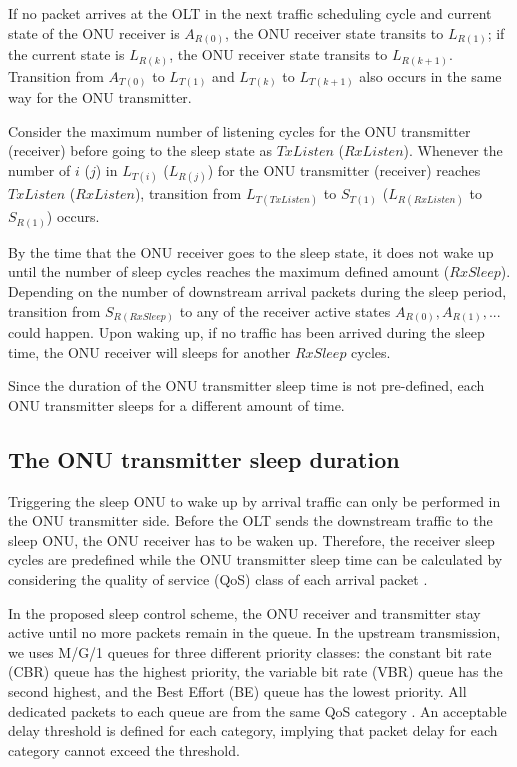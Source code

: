\documentclass[11pt,english,12pt,onecolumn, draftcls]{IEEEtran}
\theoremstyle{plain}
\theoremstyle{definition}
\begin{document}
If no packet arrives at the OLT in the next traffic scheduling cycle and current state of the ONU receiver is ${A}_{R(0)}$, the ONU receiver state transits to ${L}_{R(1)}$; if the current state is ${L}_{R(k)}$, the ONU receiver state transits to ${L}_{R(k+1)}$. Transition from ${A}_{T(0)}$ to ${L}_{T(1)}$ and ${L}_{T(k)}$ to ${L}_{T(k+1)}$ also occurs in the same way for the ONU transmitter.

Consider the maximum number of listening cycles for the ONU transmitter (receiver) before going to the sleep state as $TxListen$ ($RxListen$). Whenever the number of $i$ ($j$) in ${L}_{T(i)}$ (${L}_{R(j)}$) for the ONU transmitter (receiver) reaches $TxListen$ ($RxListen$), transition from ${L}_{T(TxListen)}$ to ${S}_{T(1)}$ (${L}_{R(RxListen)}$ to ${S}_{R(1)}$) occurs.

By the time that the ONU receiver goes to the sleep state, it does not wake up until the number of sleep cycles reaches the maximum defined amount ($RxSleep$). Depending on the number of downstream arrival packets during the sleep period, transition from ${S}_{R(RxSleep)}$ to any of the receiver active states ${A}_{R(0)},{A}_{R(1)},...$ could happen. Upon waking up, if no traffic has been arrived during the sleep time, the ONU receiver will sleeps for another $RxSleep$ cycles.

Since the duration of the ONU transmitter sleep time is not pre-defined, each ONU transmitter sleeps for a different amount of time.

\subsection{The ONU transmitter sleep duration}
\label{tx}
Triggering the sleep ONU to wake up by arrival traffic can only be performed in the ONU transmitter side. Before the OLT sends the downstream traffic to the sleep ONU, the ONU receiver has to be waken up. Therefore, the receiver sleep cycles are predefined while the ONU transmitter sleep time can be calculated by considering the quality of service (QoS) class of each arrival packet \cite{Dhaini11}.

In the proposed sleep control scheme, the ONU receiver and transmitter stay active until no more packets remain in the queue. In the upstream transmission, we uses M/G/1 queues for three different priority classes: the constant bit rate (CBR) queue has the highest priority, the variable bit rate (VBR) queue has the second highest, and the Best Effort (BE) queue has the lowest priority. All dedicated packets to each queue are from the same QoS category \cite{union2001itu}. An acceptable delay threshold is defined for each category, implying that packet delay for each category cannot exceed the threshold.
\end{document}
